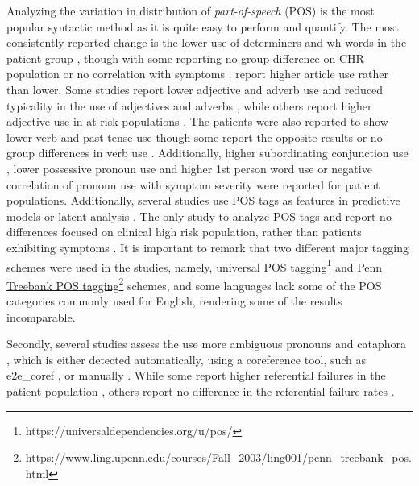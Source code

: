 Analyzing the variation in distribution of \textit{part-of-speech} (POS) is the most popular syntactic method as it is quite easy to perform and quantify. The most consistently reported change is the lower use of determiners and wh-words in the patient group \citep{bedi2015automated, corcoran2018prediction, sarzynska2021detecting, tang2021natural}, though with some reporting no group difference on CHR population \citep{bilgrami2022construct} or no correlation with symptoms \citep{corcoran2018prediction, bilgrami2022construct}. \citet{mitchell2015quantifying} report higher article use rather than lower. Some studies report lower adjective and adverb use \citep{corcoran2018prediction, tang2021natural, ziv2022morphological} and reduced typicality in the use of adjectives and adverbs \citep{bar2019semantic}, while others report higher adjective use in at risk populations \citep{argolo2023burnishing}. The patients were also reported to show lower verb and past tense use \citep{ziv2022morphological} though some report the opposite results \citep{mitchell2015quantifying} or no group differences in verb use \citep{tang2021natural, argolo2023burnishing}. Additionally, higher subordinating conjunction use \citep{silva2022syntactic}, lower possessive pronoun use \citep{corcoran2018prediction} and higher 1st person word use \citep{ziv2022morphological} or negative correlation of pronoun use with symptom severity \citep{jeong2023exploring} were reported for patient populations. Additionally, several studies use POS tags as features in predictive models or latent analysis \citep{bedi2015automated, sarzynska2021detecting, tang2022clinical, tang2023latent}. The only study to analyze POS tags and report no differences focused on clinical high risk population, rather than patients exhibiting symptoms \citep{haas2020linking}. It is important to remark that two different major tagging schemes were used in the studies, namely, \href{https://universaldependencies.org/u/pos/}{universal POS tagging}\footnote{https://universaldependencies.org/u/pos/} and \href{https://www.ling.upenn.edu/courses/Fall_2003/ling001/penn_treebank_pos.html}{Penn Treebank POS tagging}\footnote{https://www.ling.upenn.edu/courses/Fall\_2003/ling001/penn\_treebank\_pos.html} schemes, and some languages lack some of the POS categories commonly used for English, rendering some of the results incomparable.

Secondly, several studies assess the use more ambiguous pronouns and cataphora \citep{iter2018automatic, morgan2021natural, nettekoven2023semantic}, which is either detected automatically, using a coreference tool, such as e2e\_coref \citep{lee2017end}, or manually \citep{just2020modeling}. While some report higher referential failures in the patient population \citep{iter2018automatic, just2020modeling}, others report no difference in the referential failure rates \citep{morgan2021natural}.

